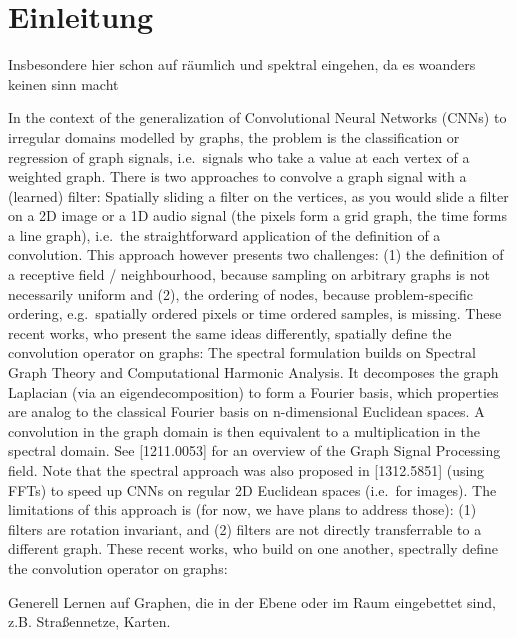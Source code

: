 \chapter{Einleitung}
\label{einleitung}

Insbesondere hier schon auf räumlich und spektral eingehen, da es woanders keinen sinn macht

In the context of the generalization of Convolutional Neural Networks (CNNs) to irregular domains modelled by graphs, the problem is the classification or regression of graph signals, i.e.\ signals who take a value at each vertex of a weighted graph. There is two approaches to convolve a graph signal with a (learned) filter:
Spatially sliding a filter on the vertices, as you would slide a filter on a 2D image or a 1D audio signal (the pixels form a grid graph, the time forms a line graph), i.e.\ the straightforward application of the definition of a convolution. This approach however presents two challenges: (1) the definition of a receptive field / neighbourhood, because sampling on arbitrary graphs is not necessarily uniform and (2), the ordering of nodes, because problem-specific ordering, e.g.\ spatially ordered pixels or time ordered samples, is missing. These recent works, who present the same ideas differently, spatially define the convolution operator on graphs:
The spectral formulation builds on Spectral Graph Theory and Computational Harmonic Analysis. It decomposes the graph Laplacian (via an eigendecomposition) to form a Fourier basis, which properties are analog to the classical Fourier basis on n-dimensional Euclidean spaces. A convolution in the graph domain is then equivalent to a multiplication in the spectral domain. See [1211.0053] for an overview of the Graph Signal Processing field. Note that the spectral approach was also proposed in [1312.5851] (using FFTs) to speed up CNNs on regular 2D Euclidean spaces (i.e.\ for images). The limitations of this approach is (for now, we have plans to address those): (1) filters are rotation invariant, and (2) filters are not directly transferrable to a different graph. These recent works, who build on one another, spectrally define the convolution operator on graphs:

Generell Lernen auf Graphen, die in der Ebene oder im Raum eingebettet sind, z.B. Straßennetze, Karten.



